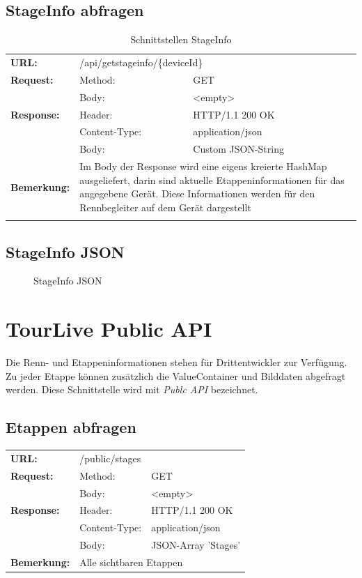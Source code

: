 \subsection{StageInfo abfragen}
\begin{longtable}{ p{2.5cm} p{3.5cm} p{6cm}}
	\textbf{URL:} & \multicolumn{2}{p{10cm}}{/api/getstageinfo/\{deviceId\}} \\
	\textbf{Request:} & Method: & GET \\
		& Body: & <empty>\\	
	\textbf{Response:} & Header: & HTTP/1.1 200 OK \\
		& Content-Type: & application/json \\
		& Body: & Custom JSON-String \\	
	\textbf{Bemerkung:} & \multicolumn{2}{p{10cm}}{Im Body der Response wird eine eigens kreierte HashMap ausgeliefert, darin sind aktuelle Etappeninformationen für das angegebene Gerät. Diese Informationen werden für den Rennbegleiter auf dem Gerät dargestellt} \\ [1ex] 
\caption{Schnittstellen StageInfo}
\end{longtable}

\subsection{StageInfo JSON}
\begin{figure}[H]
	\centering
	
	\caption{StageInfo JSON}
\end{figure}


\section{TourLive Public API}
\label{sec:tourlivepublicapi}
Die Renn- und Etappeninformationen stehen für Drittentwickler zur Verfügung. Zu jeder Etappe können zusätzlich die ValueContainer und Bilddaten abgefragt werden. Diese Schnittstelle wird mit \textit{Publc API} bezeichnet.

\subsection{Etappen abfragen}
\begin{longtable}{ p{2.5cm} p{3.5cm} p{6cm}}
	\textbf{URL:} & \multicolumn{2}{l}{/public/stages} \\
	\textbf{Request:} & Method: & GET \\
		& Body: & <empty>\\
	\textbf{Response:} &  Header: & HTTP/1.1 200 OK \\
		& Content-Type: & application/json \\
		& Body: & JSON-Array 'Stages'\\
	\textbf{Bemerkung:} & \multicolumn{2}{p{10cm}}{Alle sichtbaren Etappen} 
\end{longtable}
